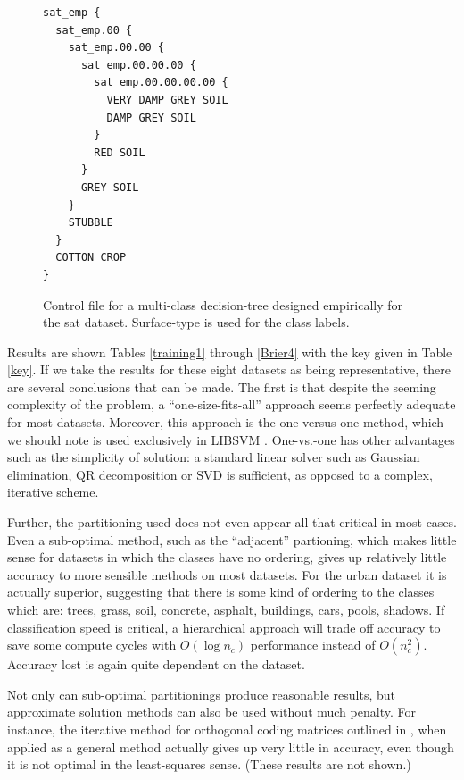 \documentclass{article}
\begin{document}
\begin{figure}[htp]
	\begin{boxedminipage}{\textwidth}
		\begin{small}
		\begin{verbatim}
sat_emp {
  sat_emp.00 {
    sat_emp.00.00 {
      sat_emp.00.00.00 {
        sat_emp.00.00.00.00 {
          VERY DAMP GREY SOIL
          DAMP GREY SOIL
        }
        RED SOIL
      }
      GREY SOIL
    }
    STUBBLE
  }
  COTTON CROP
}
		\end{verbatim}
		\end{small}
	\end{boxedminipage}
	\caption{Control file for a multi-class decision-tree designed empirically for the sat dataset. Surface-type is used for the class labels.}
	\label{sat}
\end{figure}


Results are shown Tables \ref{training1} through \ref{Brier4} with the
key given in Table \ref{key}.
If we take the results for these eight datasets as being representative,
there are several conclusions that can be made.
The first is that despite the seeming complexity of the problem, a 
``one-size-fits-all'' approach seems perfectly adequate for most datasets.
Moreover, this approach is the one-versus-one method,
which we should note is used exclusively in LIBSVM \citep{Chang_Lin2011}.
One-vs.-one has other advantages such as the simplicity of solution:
a standard linear solver such as Gaussian elimination,
QR decomposition or SVD is sufficient,
as opposed to a complex, iterative scheme.

Further, the partitioning used does not even appear all that
critical in most cases.
Even a sub-optimal method, such as the ``adjacent'' partioning, which makes
little sense for datasets in which the classes have no ordering,
gives up relatively little accuracy to more sensible methods on most datasets.
For the urban dataset it is actually superior, suggesting that there is
some kind of ordering to the classes which are: trees, grass, soil, concrete,
asphalt, buildings, cars, pools, shadows.
If classification speed is critical, a hierarchical approach will trade 
off accuracy to save some compute cycles with 
$O(\log n_c)$ performance instead of $O(n_c^2)$.
Accuracy lost is again quite dependent on the dataset.

Not only can sub-optimal partitionings produce reasonable results, 
but approximate solution methods can also be used without much penalty.
For instance, the iterative method for orthogonal coding matrices
outlined in \citet{Mills2017}, when applied as a general method
actually gives up very little in accuracy,
even though it is not optimal in the least-squares sense.
(These results are not shown.)
\end{document}
